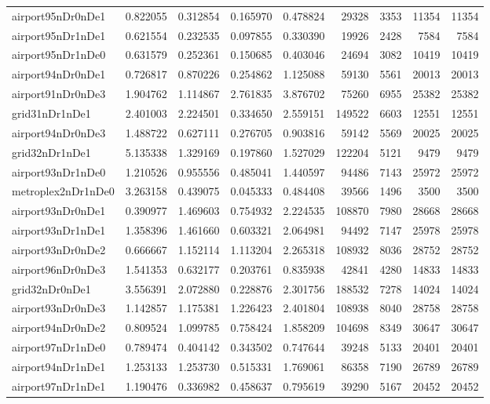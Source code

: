 \begin{longtable}{|l|r|r|r|r|r|r|r|r|}
airport95nDr0nDe1 & 0.822055 & 0.312854 & 0.165970 & 0.478824 & 29328 & 3353 & 11354 & 11354 \\
airport95nDr1nDe1 & 0.621554 & 0.232535 & 0.097855 & 0.330390 & 19926 & 2428 & 7584 & 7584 \\
airport95nDr1nDe0 & 0.631579 & 0.252361 & 0.150685 & 0.403046 & 24694 & 3082 & 10419 & 10419 \\
airport94nDr0nDe1 & 0.726817 & 0.870226 & 0.254862 & 1.125088 & 59130 & 5561 & 20013 & 20013 \\
airport91nDr0nDe3 & 1.904762 & 1.114867 & 2.761835 & 3.876702 & 75260 & 6955 & 25382 & 25382 \\
grid31nDr1nDe1 & 2.401003 & 2.224501 & 0.334650 & 2.559151 & 149522 & 6603 & 12551 & 12551 \\
airport94nDr0nDe3 & 1.488722 & 0.627111 & 0.276705 & 0.903816 & 59142 & 5569 & 20025 & 20025 \\
grid32nDr1nDe1 & 5.135338 & 1.329169 & 0.197860 & 1.527029 & 122204 & 5121 & 9479 & 9479 \\
airport93nDr1nDe0 & 1.210526 & 0.955556 & 0.485041 & 1.440597 & 94486 & 7143 & 25972 & 25972 \\
metroplex2nDr1nDe0 & 3.263158 & 0.439075 & 0.045333 & 0.484408 & 39566 & 1496 & 3500 & 3500 \\
airport93nDr0nDe1 & 0.390977 & 1.469603 & 0.754932 & 2.224535 & 108870 & 7980 & 28668 & 28668 \\
airport93nDr1nDe1 & 1.358396 & 1.461660 & 0.603321 & 2.064981 & 94492 & 7147 & 25978 & 25978 \\
airport93nDr0nDe2 & 0.666667 & 1.152114 & 1.113204 & 2.265318 & 108932 & 8036 & 28752 & 28752 \\
airport96nDr0nDe3 & 1.541353 & 0.632177 & 0.203761 & 0.835938 & 42841 & 4280 & 14833 & 14833 \\
grid32nDr0nDe1 & 3.556391 & 2.072880 & 0.228876 & 2.301756 & 188532 & 7278 & 14024 & 14024 \\
airport93nDr0nDe3 & 1.142857 & 1.175381 & 1.226423 & 2.401804 & 108938 & 8040 & 28758 & 28758 \\
airport94nDr0nDe2 & 0.809524 & 1.099785 & 0.758424 & 1.858209 & 104698 & 8349 & 30647 & 30647 \\
airport97nDr1nDe0 & 0.789474 & 0.404142 & 0.343502 & 0.747644 & 39248 & 5133 & 20401 & 20401 \\
airport94nDr1nDe1 & 1.253133 & 1.253730 & 0.515331 & 1.769061 & 86358 & 7190 & 26789 & 26789 \\
airport97nDr1nDe1 & 1.190476 & 0.336982 & 0.458637 & 0.795619 & 39290 & 5167 & 20452 & 20452 \\

\end{longtable}
